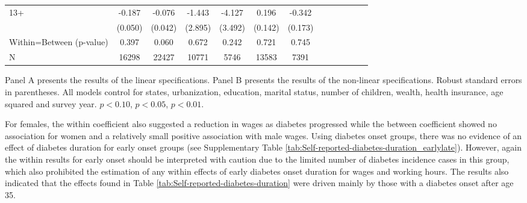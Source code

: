 \documentclass[12pt,english]{article}
\begin{document}
\begin{table}[!ht]
\begin{center}
\begin{adjustbox}{max width=.9\linewidth}
\begin{threeparttable}
{\begin{tabular}{l*{6}{S S}}
						13+&   -0.187\sym{***}&   -0.076\sym{*}  &   -1.443         &   -4.127         &    0.196         &   -0.342\sym{**} \\
						&  (0.050)         &  (0.042)         &  (2.895)         &  (3.492)         &  (0.142)         &  (0.173)         \\
						Within=Between (p-value)&  0.397         &    0.060         &    0.672         &    0.242         &    0.721         &    0.745         \\
						\midrule
						N         &    16298         &    22427         &    10771         &     5746         &    13583         &     7391         \\
						\bottomrule
					\end{tabular}
					\begin{tablenotes}
						\item \footnotesize  Panel A presents the results of the linear specifications. Panel B presents the results of the non-linear specifications. Robust standard errors in parentheses. All models control for  states, urbanization, education, marital status, number of children, wealth, health insurance, age squared and survey year. \sym{*} \(p<0.10\), \sym{**} \(p<0.05\), \sym{***} \(p<0.01\).
					\end{tablenotes}
				}
			\end{threeparttable}
		\end{adjustbox}
	\end{center}
\end{table}

For females, the within coefficient also suggested a reduction in wages as diabetes progressed while the between coefficient showed no association for women and a relatively small positive association with male wages. Using diabetes onset groups, there was no evidence of an effect of diabetes duration for early onset groups (see Supplementary Table \ref{tab:Self-reported-diabetes-duration_earlylate}). However, again the within results for early onset should be interpreted with caution due to the limited number of diabetes incidence cases in this group, which also prohibited the estimation of any within effects of early diabetes onset duration for wages and working hours. The results also indicated that the effects found in Table \ref{tab:Self-reported-diabetes-duration} were driven mainly by those with a diabetes onset after age 35.
\end{document}
